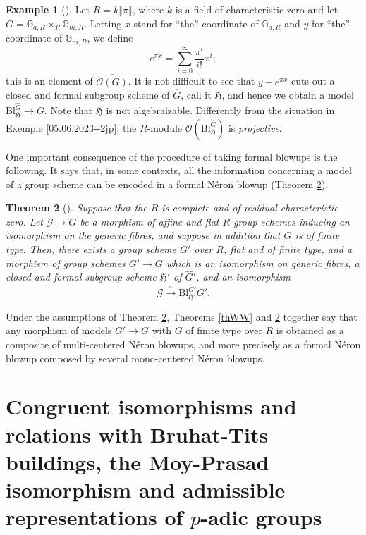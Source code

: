 \documentclass[10pt]{alggeom}
\newtheorem{thm}{Theorem}[section]
\theoremstyle{definition}
\newtheorem{ex}[thm]{Example}
\numberwithin{equation}{section}
\begin{document}
\begin{ex}[{\cite[4.3]{hai-dos_santos21}}]Let   $R=k\llbracket \pi\rrbracket$, where $k$ is a field of characteristic zero and let $G=\mathbb G_{a,R}\times_R\mathbb G_{m,R}$. Letting $x$ stand for  ``the'' coordinate of $\mathbb G_{a,R}$ and $y$ for  ``the'' coordinate of $\mathbb G_{m,R}$, we define  
\[
e^{\pi x}=\sum_{i=0}^\infty \frac {\pi^i  }{i!}x^i;
\]  
this is an element of $\widehat{\mathcal O(G)}$. It is not difficult to see that 
$y-e^{\pi x}$ cuts out a closed and formal subgroup  scheme of $\widehat G$, call it $\mathfrak H$, and hence we obtain a model $\mathrm{Bl}_{\mathfrak H}^{\widehat G}\to G$. Note that $\mathfrak H$ is not algebraizable.  Differently from the situation in Exemple \ref{05.06.2023--2jp}, the $R$-module  $\mathcal O(\mathrm{Bl}_{\mathfrak H}^{\widehat G})$ is \emph{projective}.
\end{ex}

One important consequence of the procedure of taking formal blowups is the following. It says that, in some contexts, all the information concerning a model of a group scheme can be encoded in a formal N\'eron blowup (Theorem \ref{thm3.3hds21}). 

\begin{thm}[{\cite[Corollary 3.3]{hai-dos_santos21}}] \label{thm3.3hds21} Suppose that the $R$ is     complete and of residual characteristic zero.  Let  $\mathcal G\to G$ be a morphism of affine and flat  $R$-group schemes  inducing an isomorphism on the  generic fibres, and suppose in addition that $G$ is of finite type. Then, there exists a group scheme $G'$ over $R$, flat and of finite type, and a morphism of group schemes $G'\to G$ which is an isomorphism on generic fibres, a closed and formal subgroup scheme $\mathfrak H'$ of $\widehat G'$, and an isomorphism 
\[
\mathcal G\stackrel \sim\longrightarrow \mathrm{Bl}^{\widehat  G'}_{\mathfrak H'} G'.
\]
\end{thm}

\rema Under the assumptions of Theorem \ref{thm3.3hds21},  Theorems \ref{thWW} and \ref{thm3.3hds21} together say that any morphism of models $G' \to G $ with $G$ of finite type over $R$ is obtained as a composite of multi-centered N\'eron blowups, and more precisely as a formal N\'eron blowup composed by several mono-centered N\'eron blowups. \xrema




\section{Congruent isomorphisms and relations with Bruhat-Tits buildings, the Moy-Prasad isomorphism and admissible representations of $p$-adic groups}
\label{RepIso}
\end{document}

